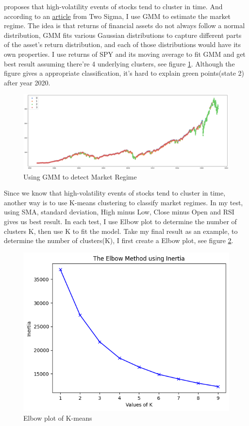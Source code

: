 \documentclass[a4paper,12pt]{article}
\begin{document}
\cite{cont_empirical_nodate} proposes that high-volatility events of stocks tend to cluster in time. And according to an \href{https://www.twosigma.com/articles/a-machine-learning-approach-to-regime-modeling/}{article} from Two Sigma, I use GMM to estimate the market regime. The idea is that returns of financial assets do not always follow a normal distribution, GMM fits various Gaussian distributions to capture different parts of the asset’s return distribution, and each of those distributions would have its own properties. I use returns of SPY and its moving average to fit GMM and get best result assuming there're 4 underlying clusters, see figure \ref{gmm_figure}. Although the figure gives a appropriate classification, it's hard to explain green points(state 2) after year 2020.

\begin{figure}[H]
    \includegraphics[scale=0.3]{GMM_tech_indic.png}
    \caption{Using GMM to detect Market Regime}\label{gmm_figure}
\end{figure}

Since we know that high-volatility events of stocks tend to cluster in time, another way is to use K-means clustering to classify market regimes. In my test, using SMA, standard deviation, High minus Low, Close minus Open and RSI gives us best result. In each test, I use Elbow plot to determine the number of clusters K, then use K to fit the model. Take my final result as an example, to determine the number of clusters(K), I first create a Elbow plot, see figure \ref{k_clusters}.

\begin{figure}[H]
    \centering
    \includegraphics[scale=0.6]{k_clusters.png}
    \caption{Elbow plot of K-means}\label{k_clusters}
\end{figure}
\end{document}
